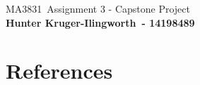 \documentclass[11pt]{article}
\def\name{Hunter Kruger-Ilingworth}
\def\doctitle{Assignment 3 - Capstone Project}
\def\subjectcode{MA3831}
\def\studentnumber{14198489}
\begin{document}
    \Huge{\subjectcode \  \doctitle} \\
    \large{\textbf{\name \ - \studentnumber}} \\

    
    

    \newpage
    \onecolumn
    \section{References}  %
    
    
\end{document}
